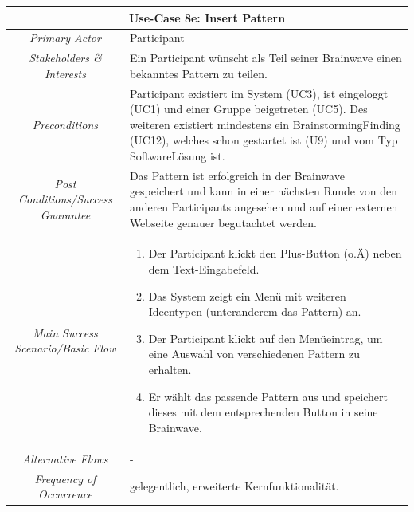 \renewcommand{\arraystretch}{1.35}
\begin{center}
	\begin{longtable}{| c | p{7cm} |}
		\hline
		\multicolumn{2}{|c|}{\textbf{Use-Case 8e: Insert Pattern}}\\
		\hline\hline
		\textit{Primary Actor} & Participant\\
		\hline
		\textit{Stakeholders \& Interests} & Ein Participant wünscht als Teil seiner Brainwave einen bekanntes Pattern zu teilen. \\
		\hline
		\textit{Preconditions} & Participant existiert im System (UC3), ist eingeloggt (UC1) und einer Gruppe beigetreten (UC5). Des weiteren existiert mindestens ein BrainstormingFinding (UC12), welches schon gestartet ist (U9) und vom Typ SoftwareLösung ist.\\
		\hline
		\textit{Post Conditions/Success Guarantee} & Das Pattern ist erfolgreich in der Brainwave gespeichert und kann in einer nächsten Runde von den anderen Participants angesehen und auf einer externen Webseite genauer begutachtet werden.\\
		\hline
		\textit{Main Success Scenario/Basic Flow} & 
		\begin{enumerate}[noitemsep]
			\item Der Participant klickt den Plus-Button (o.Ä) neben dem Text-Eingabefeld.
			\item Das System zeigt ein Menü mit weiteren Ideentypen (unteranderem das Pattern) an.
			\item Der Participant klickt auf den Menüeintrag, um eine Auswahl von verschiedenen Pattern zu erhalten.
			\item Er wählt das passende Pattern aus und speichert dieses mit dem entsprechenden Button in seine Brainwave.
		\end{enumerate}\\
		\hline
		\textit{Alternative Flows} &
		-\\
		\hline
		\textit{Frequency of Occurrence} & gelegentlich, erweiterte Kernfunktionalität.\\
		\hline
	\end{longtable}
\end{center}

